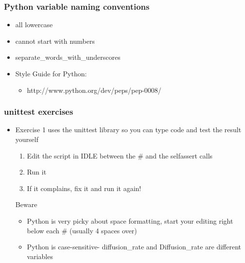 \documentclass{beamer}
\begin{document}
\begin{frame}[fragile]
\frametitle{Python variable naming conventions}
\begin{itemize}
\item all lowercase
\item cannot start with numbers
\item separate\_words\_with\_underscores
\item Style Guide for Python: 
\begin{itemize}
\item http://www.python.org/dev/peps/pep-0008/
\end{itemize}
\end{itemize}
\end{frame}

\begin{frame}[fragile]
\frametitle{unittest exercises}
\begin{itemize}
\item Exercise 1 uses the unittest library so you can type code and test the result yourself  
\begin{enumerate}
  \item Edit the script in IDLE between the \# and the selfassert calls
  \item Run it 
  \item If it complains, fix it and run it again!
\end{enumerate}
\begin{alertblock}{Beware}
\begin{itemize}
\item Python is very picky about space formatting, start your editing right below each \# (usually 4 spaces over)
\item Python is case-sensitive- diffusion\_rate and Diffusion\_rate are different variables
\end{itemize}
\end{alertblock}
\end{itemize}
\end{frame}
\end{document}
